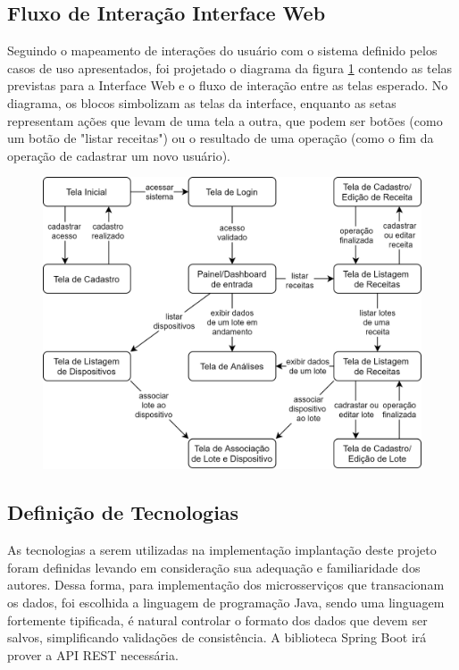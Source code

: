 \subsection{Fluxo de Interação Interface Web}


Seguindo o mapeamento de interações do usuário com o sistema definido pelos casos de uso apresentados, foi projetado o diagrama da figura \ref{fig:fluxo_interface} contendo as telas previstas para a Interface Web e o fluxo de interação entre as telas esperado. No diagrama, os blocos simbolizam as telas da interface, enquanto as setas representam ações que levam de uma tela a outra, que podem ser botões (como um botão de "listar receitas") ou o resultado de uma operação (como o fim da operação de cadastrar um novo usuário).


\begin{figure}[H]
    \centering
    \includegraphics[scale=1.0]{figuras/projeto/software/fluxo_interface.png}
    \label{fig:fluxo_interface}
\end{figure}

\subsection{Definição de Tecnologias}

As tecnologias a serem utilizadas na implementação implantação deste projeto foram definidas levando em consideração sua adequação e familiaridade dos autores. Dessa forma, para implementação dos microsserviços que transacionam os dados, foi escolhida a linguagem de programação Java, sendo uma linguagem fortemente tipificada, é natural controlar o formato dos dados que devem ser salvos, simplificando validações de consistência. A biblioteca Spring Boot irá prover a API REST necessária. 


